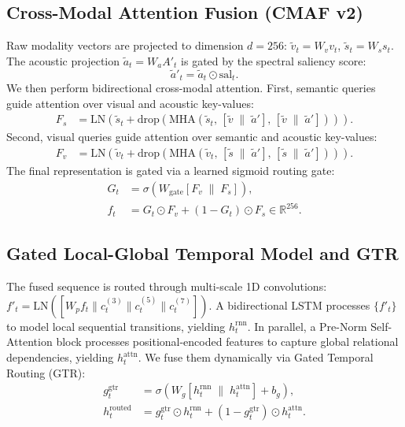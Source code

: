 \documentclass[letterpaper]{article} %
\begin{document}
\subsection{Cross-Modal Attention Fusion (CMAF v2)}
Raw modality vectors are projected to dimension $d=256$: $\tilde{v}_t = W_v v_t$, $\tilde{s}_t = W_s s_t$. The acoustic projection $\tilde{a}_t = W_a A'_t$ is gated by the spectral saliency score:
\begin{equation}
    \tilde{a}'_t = \tilde{a}_t \odot \text{sal}_t.
\end{equation}
We then perform bidirectional cross-modal attention. First, semantic queries guide attention over visual and acoustic key-values:
\begin{align}
    F_s &= \text{LN}\left(\tilde{s}_t + \text{drop}\left(\text{MHA}(\tilde{s}_t,\, [\tilde{v} \;\|\; \tilde{a}'],\, [\tilde{v} \;\|\; \tilde{a}'])\right)\right).
\end{align}
Second, visual queries guide attention over semantic and acoustic key-values:
\begin{align}
    F_v &= \text{LN}\left(\tilde{v}_t + \text{drop}\left(\text{MHA}(\tilde{v}_t,\, [\tilde{s} \;\|\; \tilde{a}'],\, [\tilde{s} \;\|\; \tilde{a}'])\right)\right).
\end{align}
The final representation is gated via a learned sigmoid routing gate:
\begin{align}
    G_t &= \sigma\left(W_{\text{gate}}\left[F_v \;\|\; F_s\right]\right), \\
    f_t &= G_t \odot F_v + (1 - G_t) \odot F_s \in \mathbb{R}^{256}.
\end{align}

\subsection{Gated Local-Global Temporal Model and GTR}
The fused sequence is routed through multi-scale 1D convolutions: $f'_t = \text{LN}([W_p f_t \| c^{(3)}_t \| c^{(5)}_t \| c^{(7)}_t])$. A bidirectional LSTM processes $\{f'_t\}$ to model local sequential transitions, yielding $h_t^{\text{rnn}}$. In parallel, a Pre-Norm Self-Attention block processes positional-encoded features to capture global relational dependencies, yielding $h_t^{\text{attn}}$.
We fuse them dynamically via Gated Temporal Routing (GTR):
\begin{align}
    g^{\text{gtr}}_t &= \sigma\left(W_g\left[h_t^{\text{rnn}} \;\|\; h_t^{\text{attn}}\right] + b_g\right), \\
    h_t^{\text{routed}} &= g^{\text{gtr}}_t \odot h_t^{\text{rnn}} + (1 - g^{\text{gtr}}_t) \odot h_t^{\text{attn}}.
\end{align}
\end{document}
